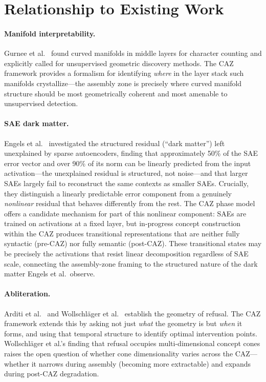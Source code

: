 \documentclass[11pt,a4paper]{article}
\begin{document}
\section{Relationship to Existing Work}
\label{sec:related}

\paragraph{Manifold interpretability.}
Gurnee et al.~\citep{gurnee2025manifolds} found curved manifolds in middle layers
for character counting and explicitly called for unsupervised geometric discovery
methods. The CAZ framework provides a formalism for identifying \emph{where} in the
layer stack such manifolds crystallize---the assembly zone is precisely where
curved manifold structure should be most geometrically coherent and most amenable
to unsupervised detection.

\paragraph{SAE dark matter.}
Engels et al.~\citep{engels2024dark} investigated the structured residual
(``dark matter'') left unexplained by sparse autoencoders, finding that approximately
50\% of the SAE error vector and over 90\% of its norm can be linearly predicted
from the input activation---the unexplained residual is structured, not noise---and
that larger SAEs largely fail to reconstruct the same contexts as smaller SAEs.
Crucially, they distinguish a linearly predictable error component from a genuinely
\emph{nonlinear} residual that behaves differently from the rest. The CAZ phase model
offers a candidate mechanism for part of this nonlinear component: SAEs are trained on
activations at a fixed layer, but in-progress concept construction within the CAZ
produces transitional representations that are neither fully syntactic (pre-CAZ) nor
fully semantic (post-CAZ). These transitional states may be precisely the activations
that resist linear decomposition regardless of SAE scale, connecting the assembly-zone
framing to the structured nature of the dark matter Engels et al.\ observe.

\paragraph{Abliteration.}
Arditi et al.~\citep{arditi2024refusal} and Wollschläger et al.~\citep{wollschlager2025cones}
establish the geometry of refusal. The CAZ framework extends this by asking not
just \emph{what} the geometry is but \emph{when} it forms, and using that temporal
structure to identify optimal intervention points. Wollschläger et al.'s finding
that refusal occupies multi-dimensional concept cones raises the open question of
whether cone dimensionality varies across the CAZ---whether it narrows during
assembly (becoming more extractable) and expands during post-CAZ degradation.
\end{document}
